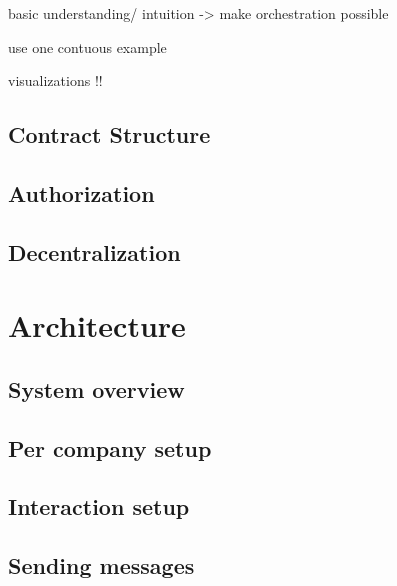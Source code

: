 \documentclass[runningheads]{llncs}
\begin{document}
basic understanding/ intuition
-> make orchestration possible

use one contuous example

visualizations !!

\subsection{Contract Structure}

\subsection{Authorization}

\subsection{Decentralization}

\section{Architecture}

\subsection{System overview}

\subsection{Per company setup}

\subsection{Interaction setup}

\subsection{Sending messages}
\end{document}
